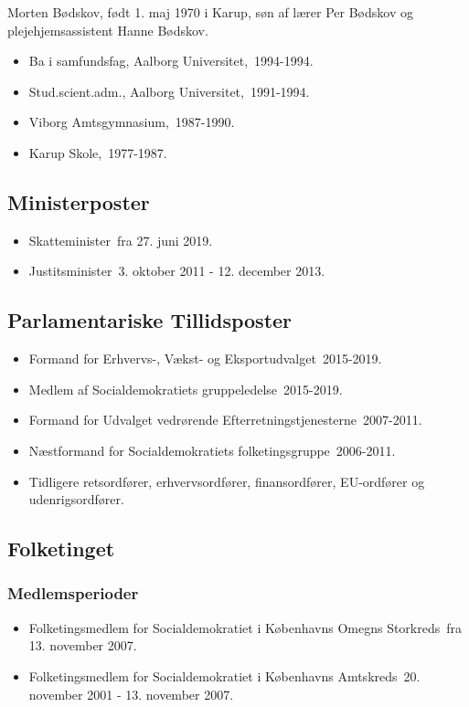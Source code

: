 \documentclass[11pt, a4paper]{awesome-cv}
\begin{document}
\makecvheader[R]
\makelettertitle
\begin{cvletter}
Morten Bødskov, født 1. maj 1970 i Karup, søn af lærer Per Bødskov og plejehjemsassistent Hanne Bødskov.

\begin{itemize}
\item Ba i samfundsfag, Aalborg Universitet, 1994-1994.
\item Stud.scient.adm., Aalborg Universitet, 1991-1994.
\item Viborg Amtsgymnasium, 1987-1990.
\item Karup Skole, 1977-1987.
\end{itemize}
\subsection*{Ministerposter}
\begin{itemize}
\item Skatteminister fra 27. juni 2019.
\item Justitsminister 3. oktober 2011 - 12. december 2013.
\end{itemize}
\subsection*{Parlamentariske Tillidsposter}
\begin{itemize}
\item Formand for Erhvervs-, Vækst- og Eksportudvalget 2015-2019.
\item Medlem af Socialdemokratiets gruppeledelse 2015-2019.
\item Formand for Udvalget vedrørende Efterretningstjenesterne 2007-2011.
\item Næstformand for Socialdemokratiets folketingsgruppe 2006-2011.
\item Tidligere retsordfører, erhvervsordfører, finansordfører, EU-ordfører og udenrigsordfører.
\end{itemize}
\subsection*{Folketinget}
\subsubsection*{Medlemsperioder}
\begin{itemize}
\item Folketingsmedlem for Socialdemokratiet i Københavns Omegns Storkreds fra 13. november 2007.
\item Folketingsmedlem for Socialdemokratiet i Københavns Amtskreds 20. november 2001 - 13. november 2007.
\end{itemize}

\end{cvletter}
\end{document}
